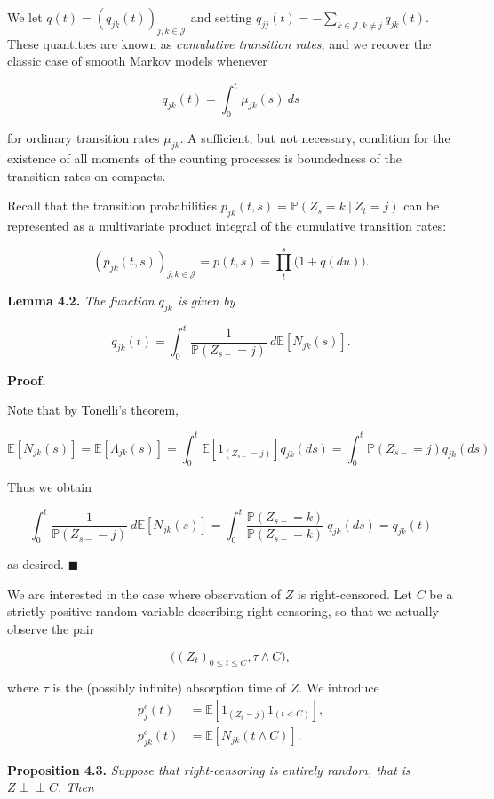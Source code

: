 \documentclass[a4paper,10pt,openany]{book}
\begin{document}
We let \(q(t)=(q_{jk}(t))_{j,k\in\mathcal J}\) and setting \(q_{jj}(t)=-\sum_{k\in\mathcal J, k\ne j}q_{jk}(t)\). These quantities are known as \emph{cumulative transition rates}, and we recover the classic case of smooth Markov models whenever

\[
q_{jk}(t)=\int_0^t\mu_{jk}(s)\ ds
\]

for ordinary transition rates \(\mu_{jk}\). A sufficient, but not necessary, condition for the existence of all moments of the counting processes is boundedness of the transition rates on compacts.

Recall that the transition probabilities \(p_{jk}(t, s) =\mathbb P(Z_s = k\ \vert\ Z_t = j)\) can be represented as a multivariate product integral of the cumulative transition rates:

\[
(p_{jk}(t,s))_{j,k\in\mathcal J}=p(t,s)=\prod_t^s\Big(1+q(du)\Big).
\]

\textbf{Lemma 4.2.} \emph{The function \(q_{jk}\) is given by}

\[
q_{jk}(t)=\int_0^t\frac{1}{\mathbb P(Z_{s-}=j)}\ d\mathbb E[N_{jk}(s)].
\]

\textbf{Proof.}

Note that by Tonelli's theorem,

\[
\mathbb E[N_{jk}(s)]=\mathbb E[\Lambda_{jk}(s)]=\int_0^t \mathbb E[1_{(Z_{s-}=j)}] q_{jk}(ds)=\int_0^t \mathbb P(Z_{s-}=j) q_{jk}(ds)
\]

Thus we obtain

\[
\int_0^t\frac{1}{\mathbb P(Z_{s-}=j)}\ d\mathbb E[N_{jk}(s)]=\int_0^t\frac{\mathbb P(Z_{s-}=k)}{\mathbb P(Z_{s-}=k)}\ q_{jk}(ds)=q_{jk}(t)
\]

as desired. \(\blacksquare\)

We are interested in the case where observation of \(Z\) is right-censored. Let \(C\) be a strictly positive random variable describing right-censoring, so that we actually observe the pair

\[
\Big((Z_t)_{0\le t\le C}, \tau \wedge C\Big),
\]

where \(\tau\) is the (possibly infinite) absorption time of \(Z\). We introduce
\begin{align*}
p^c_j(t)&=\mathbb E\left[1_{(Z_t=j)}1_{(t<C)}\right],\\
p^c_{jk}(t)&=\mathbb E\left[ N_{jk}(t\wedge C)\right].
\end{align*}

\textbf{Proposition 4.3.} \emph{Suppose that right-censoring is entirely random, that is \(Z \perp \!\!\! \perp C\). Then}
\end{document}
